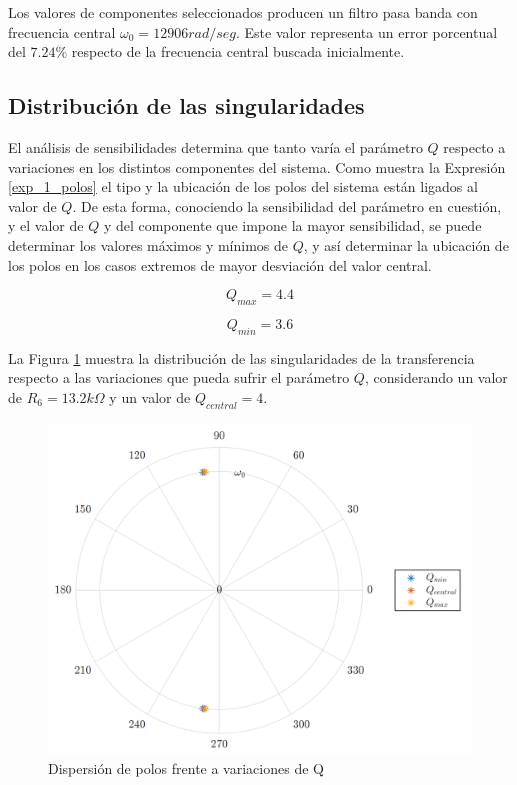 Los valores de componentes seleccionados producen un filtro pasa banda con frecuencia central $\omega_0 = 12906 rad/seg$. Este valor representa un error porcentual del $7.24\%$ respecto de la frecuencia central buscada inicialmente.

\subsection{Distribución de las singularidades}
El análisis de sensibilidades determina que tanto varía el parámetro $Q$ respecto a variaciones en los distintos componentes del sistema. Como muestra la Expresión \ref{exp_1_polos} el tipo y la ubicación de los polos del sistema están ligados al valor de $Q$. De esta forma, conociendo la sensibilidad del parámetro en cuestión, y el valor de $Q$ y del componente que impone la mayor sensibilidad, se puede determinar los valores máximos y mínimos de $Q$, y así determinar la ubicación de los polos en los casos extremos de mayor desviación del valor central.

\[
Q_{max} = 4.4
\]

\[
Q_{min} = 3.6
\]

La Figura \ref{polos_sens_Q} muestra la distribución de las singularidades de la transferencia respecto a las variaciones que pueda sufrir el parámetro $Q$, considerando un valor de $R_6 = 13.2k\Omega$ y un valor de $Q_{central} = 4$.

\begin{figure}[H]
\centering
\includegraphics[scale=0.5]{resources/polos_sens_Q}
\caption{Dispersión de polos frente a variaciones de Q}
\label{polos_sens_Q}
\end{figure}

